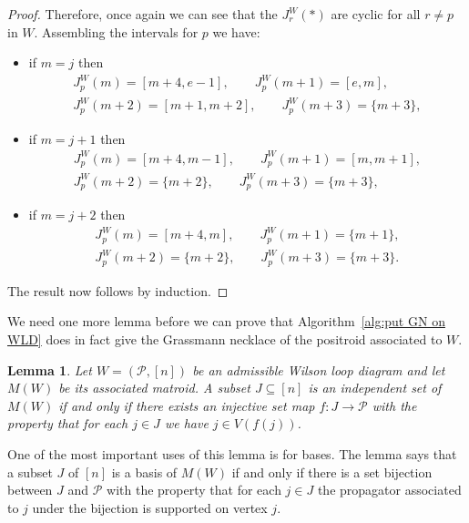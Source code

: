 \documentclass[11pt]{article}
\newcommand{\cP}{\mathcal{P}}
\newtheorem{lem}[thm]{Lemma}
\theoremstyle{remark}
\theoremstyle{definition}
\begin{document}
\begin{proof}
Therefore, once again we can see that the $J_r^{W}(*)$ are cyclic for all $r\neq p$ in $W$.  Assembling the intervals for $p$ we have:
\begin{itemize}
\item if $m=j$ then
\begin{gather*}J_p^{W}(m) = [m+4,e-1], \qquad  J_p^{W}(m+1) = [e,m], \\  J_p^{W}(m+2) = [m+1,m+2], \qquad  J_p^{W}(m+3) = \{m+3\},\end{gather*}
\item if $m=j+1$ then
\begin{gather*}J_p^{W}(m) = [m+4,m-1], \qquad J_p^{W}(m+1) = [m,m+1], \\  J_p^{W}(m+2) = \{m+2\}, \qquad  J_p^{W}(m+3) = \{m+3\},\end{gather*}
\item if $m=j+2$ then
\begin{gather*}J_p^{W}(m) = [m+4,m], \qquad  J_p^{W}(m+1) = \{m+1\}, \\  J_p^{W}(m+2) = \{m+2\}, \qquad  J_p^{W}(m+3) = \{m+3\}.\end{gather*}
\end{itemize}
The result now follows by induction.
\end{proof}



We need one more lemma before we can prove that Algorithm~\ref{alg:put GN on WLD} does in fact give the Grassmann necklace of the positroid associated to $W$.

\begin{lem}\label{lem basis as perm}
Let $W = (\cP,[n])$ be an admissible Wilson loop diagram and let $M(W)$ be its associated matroid. A subset $J \subseteq [n]$ is an independent set of $M(W)$ if and only if there exists an injective set map $f : J \rightarrow \cP$ with the property that for each $j\in J$ we have $j \in V(f(j))$.
\end{lem}

One of the most important uses of this lemma is for bases.  The lemma says that a subset $J$ of $[n]$ is a basis of $M(W)$ if and only if there is a set bijection between $J$ and $\cP$ with the property that for each $j\in J$ the propagator associated to $j$ under the bijection is supported on vertex $j$.
\end{document}
